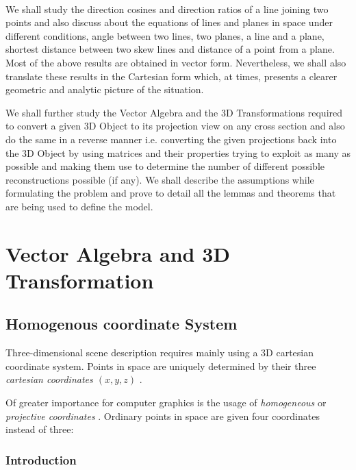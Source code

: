 \documentclass[12pt]{report}
\begin{document}
\\
\vspace{0.5cm}

We shall study the direction cosines and direction ratios of a line joining two points and also discuss about the equations of lines and planes in space under different conditions, angle between two lines, two planes, a line and a plane, shortest distance between two skew lines and distance of a point from a plane. Most of the above results are obtained in vector form. Nevertheless, we shall also translate these results in the Cartesian form which, at times, presents a clearer geometric and analytic picture of the situation.
\\
\vspace{0.5cm}

We shall further study the Vector Algebra and the 3D Transformations required to convert a given 3D Object to its projection view on any cross section and also do the same in a reverse manner i.e. converting the given projections back into the 3D Object by using matrices and their properties trying to exploit as many as possible and making them use to determine the number of different possible reconstructions possible (if any). We shall describe the assumptions while formulating the problem and prove to detail all the lemmas and theorems that are being used to define the model.
\\

\chapter{Vector Algebra and 3D Transformation}

\section{Homogenous coordinate System}

Three-dimensional scene description requires mainly using a 3D cartesian coordinate system. Points in space are uniquely determined by their three \textit{ cartesian coordinates $(x, y, z)$ } .

\vspace{0.5cm}
\noindent Of greater importance for computer graphics is the usage of \textit{ homogeneous} or \textit{projective coordinates }. Ordinary points in space are given four coordinates instead of three:


\subsection{Introduction}
\end{document}
